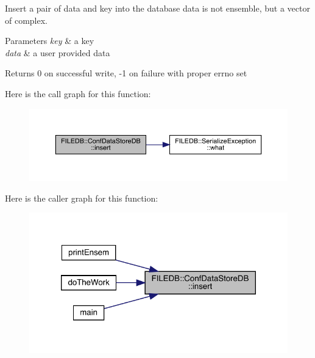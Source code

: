 Insert a pair of data and key into the database data is not ensemble, but a vector of complex. 
\begin{DoxyParams}{Parameters}
{\em key} & a key \\
\hline
{\em data} & a user provided data\\
\hline
\end{DoxyParams}
\begin{DoxyReturn}{Returns}
0 on successful write, -\/1 on failure with proper errno set 
\end{DoxyReturn}
Here is the call graph for this function\+:
\nopagebreak
\begin{figure}[H]
\begin{center}
\leavevmode
\includegraphics[width=350pt]{d8/d19/classFILEDB_1_1ConfDataStoreDB_a9917cff27ec340f88e59ddb9be630ecf_cgraph}
\end{center}
\end{figure}
Here is the caller graph for this function\+:\nopagebreak
\begin{figure}[H]
\begin{center}
\leavevmode
\includegraphics[width=320pt]{d8/d19/classFILEDB_1_1ConfDataStoreDB_a9917cff27ec340f88e59ddb9be630ecf_icgraph}
\end{center}
\end{figure}
\mbox{\label{classFILEDB_1_1ConfDataStoreDB_a82fea8d8ac1a2c096614b213087a73d2}} 
